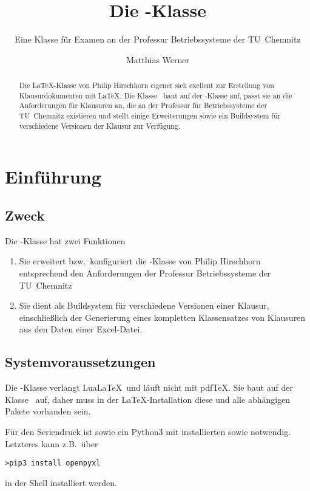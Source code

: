 \documentclass[
load=osgexam,
babel=ngerman
]{skdoc}
\author{Matthias Werner}
\title{Die \thepkg-Klasse}
\subtitle{Eine Klasse für Examen an der Professur Betriebssysteme der TU~Chemnitz}
\begin{document}
\maketitle
\begin{abstract}
    Die \LaTeX-Klasse  von \textsf{Philip Hirschhorn} eigenet sich exellent zur Erstellung von
    Klausurdokumenten mit \LaTeX. Die Klasse \thepkg\  baut auf der -Klasse auf, passt sie an die
    Anforderungen für Klausuren an, die an der Professur für Betriebssysteme der TU~Chemnitz existieren und stellt
    einige Erweiterungen sowie ein Buildsystem für verschiedene Versionen der Klausur zur Verfügung.
\end{abstract}

\tableofcontents\clearpage


\section{Einführung}
\subsection{Zweck}
Die -Klasse hat zwei Funktionen
\begin{enumerate}
  \item Sie erweitert bzw.\ konfiguriert die -Klasse von \textsf{Philip Hirschhorn} entsprechend den
    Anforderungen der Professur Betriebssysteme der TU~Chemnitz
  \item Sie dient als Buildsystem für verschiedene Versionen einer Klausur, einschließlich der Generierung eines
    kompletten Klassensatzes von Klausuren aus den Daten einer Excel-Datei.
\end{enumerate}
\subsection{Systemvoraussetzungen}
Die \thepkg-Klasse verlangt Lua\LaTeX\ und läuft nicht mit pdfTeX. Sie baut auf der Klasse \ auf, daher muss
in der \LaTeX-Installation diese und alle abhängigen Pakete vorhanden sein.
 
Für den Seriendruck ist  sowie ein Python3 mit installierten
 sowie notwendig. Letzteres kann z.\;B.\ über

\begin{verbatim}
>pip3 install openpyxl
\end{verbatim}
in der Shell installiert werden.
\end{document}
